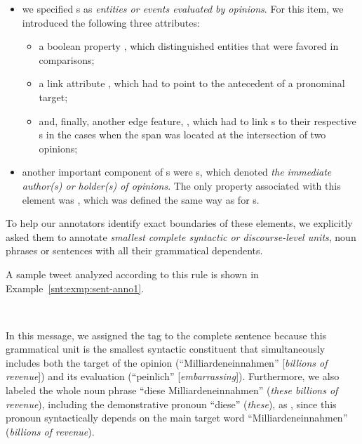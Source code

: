 \begin{itemize}
\item
  we specified \textbf{}s as \emph{entities or events
    evaluated by opinions}.  For this item, we introduced the
  following three attributes:
  \begin{itemize}
    \item
      a boolean property , which distinguished
      entities that were favored in comparisons;
    \item
      a link attribute , which had to point to the
      antecedent of a pronominal target;
    \item and, finally, another edge feature,
      , which had to link s
      to their respective s in the cases when the
       span was located at the intersection of two
      opinions;
  \end{itemize}

\item
  another important component of s were
  \textbf{}s, which denoted \emph{the immediate
    author(s) or holder(s) of opinions}.  The only property associated
  with this element was , which was defined
  the same way as for s.
\end{itemize}
To help our annotators identify exact boundaries of these elements, we
explicitly asked them to annotate \emph{smallest complete syntactic or
  discourse-level units}, \ie{} noun phrases or sentences with all
their grammatical dependents.

A sample tweet analyzed according to this rule is shown in
Example~\ref{snt:exmp:sent-anno1}.
\begin{example}\label{snt:exmp:sent-anno1}
  \upshape{}\\[0.8em]
  \noindent{}
\end{example}
In this message, we assigned the  tag to the
complete sentence because this grammatical unit is the smallest
syntactic constituent that simultaneously includes both the target of
the opinion (``Milliardeneinnahmen'' [\emph{billions of revenue}]) and
its evaluation (``peinlich'' [\emph{embarrassing}]).  Furthermore, we
also labeled the whole noun phrase ``diese Milliardeneinnahmen''
(\emph{these billions of revenue}), including the demonstrative
pronoun ``diese'' (\emph{these}), as , since this
pronoun syntactically depends on the main target word
``Milliardeneinnahmen'' (\emph{billions of revenue}).

